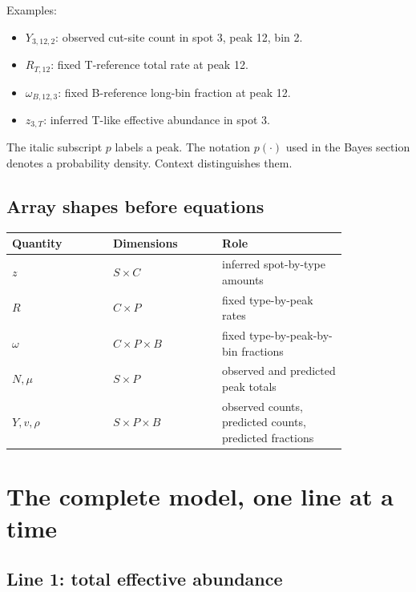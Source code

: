 \documentclass[11pt]{article}
\begin{document}
Examples:

\begin{itemize}[leftmargin=2em]
  \item \(Y_{3,12,2}\): observed cut-site count in spot 3, peak 12, bin 2.
  \item \(R_{T,12}\): fixed T-reference total rate at peak 12.
  \item \(\omega_{B,12,3}\): fixed B-reference long-bin fraction at peak 12.
  \item \(z_{3,T}\): inferred T-like effective abundance in spot 3.
\end{itemize}

\begin{watchout}
The italic subscript \(p\) labels a peak. The notation \(p(\cdot)\) used in the
Bayes section denotes a probability density. Context distinguishes them.
\end{watchout}

\subsection{Array shapes before equations}

\begin{center}
\begin{tabular}{L{0.25\linewidth}C{0.27\linewidth}L{0.31\linewidth}}
\toprule
Quantity & Dimensions & Role \\
\midrule
\(z\) & \(S\times C\) & inferred spot-by-type amounts \\
\(R\) & \(C\times P\) & fixed type-by-peak rates \\
\(\omega\) & \(C\times P\times B\) & fixed type-by-peak-by-bin fractions \\
\(N,\mu\) & \(S\times P\) & observed and predicted peak totals \\
\(Y,v,\rho\) & \(S\times P\times B\) & observed counts, predicted counts, predicted fractions \\
\bottomrule
\end{tabular}
\end{center}

\section{The complete model, one line at a time}

\subsection{Line 1: total effective abundance}
\end{document}
